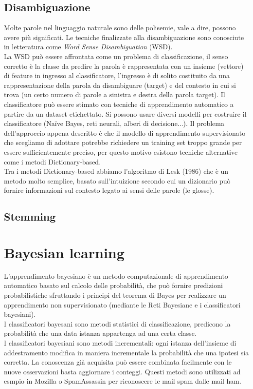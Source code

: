 \documentclass{article}
\theoremstyle{plain}
\theoremstyle{definition}
\begin{document}
\subsection{Disambiguazione}
Molte parole nel linguaggio naturale sono delle polisemie, vale a dire, possono avere più significati. Le tecniche finalizzate alla disambiguazione sono conosciute in letteratura come \textit{Word Sense Disambiguation} (WSD).
\\
La WSD può essere affrontata come un problema di classificazione, il senso corretto è la classe da predire la parola è rappresentata con un insieme (vettore) di feature in ingresso al classificatore, l'ingresso è di solito costituito da una rappresentazione della parola da disambiguare (target) e del contesto in cui si trova (un certo numero di parole a sinistra e destra della parola target). Il classificatore può essere stimato con tecniche di apprendimento automatico a partire da un dataset etichettato. Si possono usare diversi modelli per costruire il classificatore (Naïve Bayes, reti neurali, alberi di decisione...).
Il problema dell'approccio appena descritto è che il modello di apprendimento supervisionato che scegliamo di adottare potrebbe richiedere un training set troppo grande per essere sufficientemente preciso, per questo motivo esistono tecniche alternative come i metodi Dictionary-based.
\\
Tra i metodi Dictionary-based abbiamo l'algoritmo di Lesk (1986) che è un metodo molto semplice, basato sull'intuizione secondo cui un dizionario può fornire informazioni sul contesto legato ai sensi delle parole (le glosse).  

 
\subsection{Stemming}





\newpage
\section{Bayesian learning}
L'apprendimento bayesiano è un metodo computazionale di apprendimento automatico basato sul calcolo delle probabilità, che può fornire predizioni probabilistiche sfruttando i principi del teorema di Bayes per realizzare un apprendimento non supervisionato (mediante le Reti Bayesiane e i classificatori bayesiani).
\\
I classificatori bayesani sono metodi statistici di classificazione, predicono la probabilità che una data istanza appartenga ad una certa classe.
\\
I classificatori bayesiani sono metodi incrementali: ogni istanza dell’insieme di addestramento modifica in maniera incrementale la probabilità che una ipotesi sia corretta.
La conoscenza già acquisita può essere combinata facilmente con le nuove osservazioni basta aggiornare i conteggi. Questi metodi sono utilizzati ad esmpio in Mozilla o SpamAssassin per riconoscere le mail spam dalle mail ham.\footnotemark
\end{document}
